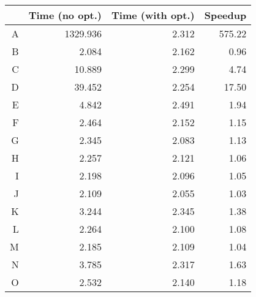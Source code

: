 
\begin{table}  \begin{center}
\begin{tabular}{ l r r r }
\toprule
\multicolumn{1}{r|}{} & Time (no opt.) & Time (with opt.) & Speedup \\
\midrule
\multicolumn{1}{r|}{A} & 1329.936 & 2.312 & 575.22 \\
\multicolumn{1}{r|}{B} & 2.084 & 2.162 & 0.96 \\
\multicolumn{1}{r|}{C} & 10.889 & 2.299 & 4.74 \\
\multicolumn{1}{r|}{D} & 39.452 & 2.254 & 17.50 \\
\multicolumn{1}{r|}{E} & 4.842 & 2.491 & 1.94 \\
\multicolumn{1}{r|}{F} & 2.464 & 2.152 & 1.15 \\
\multicolumn{1}{r|}{G} & 2.345 & 2.083 & 1.13 \\
\multicolumn{1}{r|}{H} & 2.257 & 2.121 & 1.06 \\
\multicolumn{1}{r|}{I} & 2.198 & 2.096 & 1.05 \\
\multicolumn{1}{r|}{J} & 2.109 & 2.055 & 1.03 \\
\multicolumn{1}{r|}{K} & 3.244 & 2.345 & 1.38 \\
\multicolumn{1}{r|}{L} & 2.264 & 2.100 & 1.08 \\
\multicolumn{1}{r|}{M} & 2.185 & 2.109 & 1.04 \\
\multicolumn{1}{r|}{N} & 3.785 & 2.317 & 1.63 \\
\multicolumn{1}{r|}{O} & 2.532 & 2.140 & 1.18 \\


\end{tabular}
\end{center}
\end{table}
